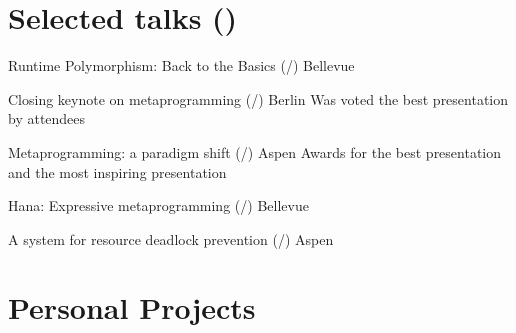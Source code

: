 \documentclass[10pt]{moderncv}
\newcommand{\myhref}[3][blue]{\href{#2}{\color{#1}{#3}}}
\begin{document}


\section{Selected talks (\myhref{http://ldionne.github.io/talks}{full list})}
        {Runtime Polymorphism: Back to the Basics (\myhref{http://ldionne.com/cppcon-2017-runtime-polymorphism}{slides}/\myhref{https://youtu.be/gVGtNFg4ay0}{video})}
        {\myhref{http://cppcon.org}{CppCon}}{Bellevue}{}{}

        {Closing keynote on metaprogramming (\myhref{http://ldionne.github.io/meetingcpp-2016}{slides}/\myhref{https://youtu.be/X_p9X5RzBJE}{video})}
        {\myhref{https://meetingcpp.com}{Meeting C++}}{Berlin}{}
        {Was voted the best presentation by attendees}

        {Metaprogramming: a paradigm shift (\myhref{http://ldionne.github.io/hana-cppnow-2015}{slides}/\myhref{http://youtu.be/Z2ABRaQiFHs}{video})}
        {\myhref{http://www.cppnow.org}{C++Now}}{Aspen}{}
        {Awards for the best presentation and the most inspiring presentation}

        {Hana: Expressive metaprogramming (\myhref{http://ldionne.github.io/hana-cppcon-2014/}{slides}/\myhref{https://www.youtube.com/watch?v=L2SktfaJPuU}{video})}
        {\myhref{http://cppcon.org}{CppCon}}{Bellevue}{}{}

        {A system for resource deadlock prevention (\myhref{http://ldionne.github.io/d2-cppnow-2013}{slides}/\myhref{https://www.youtube.com/watch?v=Re67U4zAN-M}{video})}
        {\myhref{http://www.cppnow.org}{C++Now}}{Aspen}{}{}


\section{Personal Projects}
\newcommand{\PersonalProject}[4]{
    \cvline{\myhref{#2}{#1}}{
        \textbf{#3}\newline
        #4
    }
}
\end{document}
